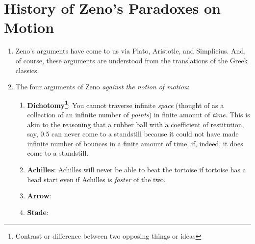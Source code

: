 \documentclass[12pt,a4paper]{book}
\begin{document}
\appendix
\chapter{History of Zeno's Paradoxes on Motion}
\label{zeno}
\begin{enumerate}
    \item Zeno's arguments have come to us via Plato, Aristotle, and Simplicius. And, of course, these arguments are understood from the translations of the Greek classics.
    \item The four arguments of Zeno \emph{against the notion of motion}:
        \begin{enumerate}
            \item \textbf{Dichotomy\footnote{Contrast or difference between two opposing things or ideas}}: You cannot traverse infinite \emph{space} (thought of as a collection of an infinite number of \emph{points}) in finite amount of \emph{time}. This is akin to the reasoning that a rubber ball with a coefficient of restitution, say, 0.5 can never come to a standstill because it could not have made infinite number of bounces in a finite amount of time, if, indeed, it does come to a standstill.
            \item \textbf{Achilles}: Achilles will never be able to beat the tortoise if tortoise has a head start even if Achilles is \emph{faster} of the two.
            \item \textbf{Arrow}:
            \item \textbf{Stade}:
        \end{enumerate}
\end{enumerate}
\end{document}

